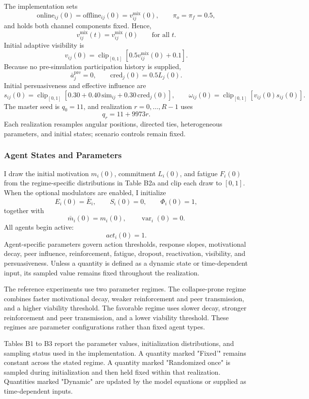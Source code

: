 \documentclass[11pt]{article}
\begin{document}
The implementation sets
\[
\mathrm{online}_{ij}(0)
=
\mathrm{offline}_{ij}(0)
=
v_{ij}^{\mathrm{mix}}(0),
\qquad
\pi_o=\pi_f=0.5,
\]
and holds both channel components fixed. Hence,
\[
v_{ij}^{\mathrm{mix}}(t)
=
v_{ij}^{\mathrm{mix}}(0)
\qquad
\text{for all }t.
\]
Initial adaptive visibility is
\[
v_{ij}(0)
=
\operatorname{clip}_{[0,1]}
\left[
0.5v_{ij}^{\mathrm{mix}}(0)+0.1
\right].
\]
Because no pre-simulation participation history is supplied,
\[
\bar{a}_{j}^{\mathrm{pre}}=0,
\qquad
\mathrm{cred}_{j}(0)=0.5L_j(0).
\]
Initial persuasiveness and effective influence are
\[
s_{ij}(0)
=
\operatorname{clip}_{[0,1]}
\left[
0.30
+
0.40\,\mathrm{sim}_{ij}
+
0.30\,\mathrm{cred}_{j}(0)
\right],
\qquad
\omega_{ij}(0)
=
\operatorname{clip}_{[0,1]}
\left[
v_{ij}(0)s_{ij}(0)
\right].
\]
The master seed is \(q_0=11\), and realization $r=0,\ldots,R-1$ uses
\[
q_r=11+9973r.
\]
Each realization resamples angular positions, directed ties, heterogeneous parameters, and initial states; scenario controls remain fixed. 

\subsubsection{Agent States and Parameters}
I draw the initial motivation \(m_i(0)\), commitment \(L_i(0)\), and fatigue
\(F_i(0)\) from the regime-specific distributions in Table B2a and clip each
draw to \([0,1]\). When the optional modulators are enabled, I initialize
\[
E_i(0)=\bar E_i,
\qquad
S_i(0)=0,
\qquad
\Phi_i(0)=1,
\]
together with
\[
\bar m_i(0)=m_i(0),
\qquad
\operatorname{var}_i(0)=0.
\]
All agents begin active:
\[
act_i(0)=1.
\]
Agent-specific parameters govern action thresholds, response slopes,
motivational decay, peer influence, reinforcement, fatigue, dropout,
reactivation, visibility, and persuasiveness. Unless a quantity is defined as a dynamic state or time-dependent input, its sampled value remains fixed throughout the realization.

The reference experiments use two parameter regimes. The collapse-prone regime combines faster motivational decay, weaker reinforcement and peer transmission, and a higher viability threshold. The favorable regime uses slower decay, stronger reinforcement and peer transmission, and a lower
viability threshold. These regimes are parameter configurations rather than fixed agent types.

Tables B1 to B3 report the parameter values, initialization distributions, and sampling status used in the implementation. A quantity marked "Fixed'" remains constant across the stated regime. A quantity marked "Randomized once" is sampled during initialization and then held fixed within that realization. Quantities marked "Dynamic" are updated by the model equations or supplied as time-dependent inputs.
\end{document}

